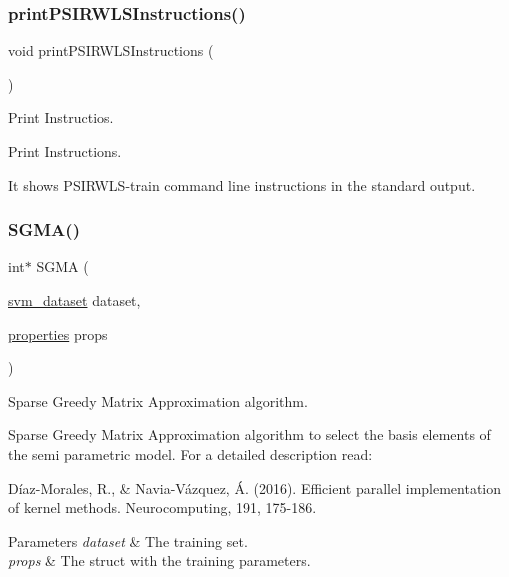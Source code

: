 \subsubsection{\texorpdfstring{print\+P\+S\+I\+R\+W\+L\+S\+Instructions()}{printPSIRWLSInstructions()}}
{\ttfamily void print\+P\+S\+I\+R\+W\+L\+S\+Instructions (\begin{DoxyParamCaption}{ }\end{DoxyParamCaption})}



Print Instructios. 

Print Instructions.

It shows P\+S\+I\+R\+W\+L\+S-\/train command line instructions in the standard output. \hypertarget{PSIRWLS-train_8c_a50a6e1f36a010feb91db9b9b38679948}{}\label{PSIRWLS-train_8c_a50a6e1f36a010feb91db9b9b38679948} 
\subsubsection{\texorpdfstring{S\+G\+M\+A()}{SGMA()}}
{\ttfamily int$\ast$ S\+G\+MA (\begin{DoxyParamCaption}\item[{\hyperlink{structsvm__dataset}{svm\+\_\+dataset}}]{dataset,  }\item[{\hyperlink{structproperties}{properties}}]{props }\end{DoxyParamCaption})}



Sparse Greedy Matrix Approximation algorithm. 

Sparse Greedy Matrix Approximation algorithm to select the basis elements of the semi parametric model. For a detailed description read\+:

Díaz-\/\+Morales, R., \& Navia-\/\+Vázquez, Á. (2016). Efficient parallel implementation of kernel methods. Neurocomputing, 191, 175-\/186.


\begin{DoxyParams}{Parameters}
{\em dataset} & The training set. \\
\hline
{\em props} & The struct with the training parameters. \\
\hline
\end{DoxyParams}
